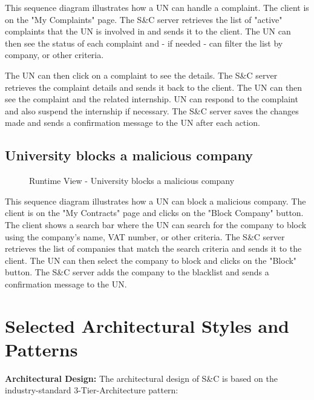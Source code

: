 \par This sequence diagram illustrates how a UN can handle a complaint. The client is on the "My Complaints" page. The 
S\&C server retrieves the list of "active" complaints that the UN is involved in and sends it to the client. The UN can 
then see the status of each complaint and - if needed - can filter the list by company, or other criteria.

\par The UN can then click on a complaint to see the details. The S\&C server retrieves the complaint details and sends
it back to the client. The UN can then see the complaint and the related internship. UN can respond to the complaint 
and also suspend the internship if necessary. The S\&C server saves the changes made and sends a confirmation message 
to the UN after each action.

\subsection{University blocks a malicious company}
\label{sub:university-blocks-a-malicious-company}%

\begin{figure}[H]
      \centering
      \caption{Runtime View - University blocks a malicious company}
      \label{fig:rv-un-blocks-company}
\end{figure}

\par This sequence diagram illustrates how a UN can block a malicious company. The client is on the "My Contracts" page 
and clicks on the "Block Company" button. The client shows a search bar where the UN can search for the company to 
block using the company's name, VAT number, or other criteria. The S\&C server retrieves the list of companies that 
match the search criteria and sends it to the client. The UN can then select the company to block and clicks on the 
"Block" button. The S\&C server adds the company to the blacklist and sends a confirmation message to the UN.

\section{Selected Architectural Styles and Patterns}
\label{sec:selected-architectural-styles-patterns}%

\par{\textbf{Architectural Design:}} The architectural design of S\&C is based on the industry-standard 3-Tier-Architecture pattern:

